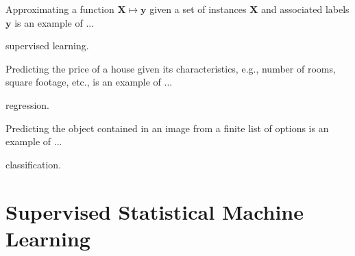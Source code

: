 \begin{questions}
\begin{parts}
\end{parts}

\question Approximating a function $\bm{X} \mapsto \bm{y}$ given a set of instances $\bm{X}$ and associated labels $\bm{y}$ is an example of ...



\begin{solution}[.5in]
supervised learning.
\end{solution}


\question Predicting the price of a house given its characteristics, e.g., number of rooms, square footage, etc., is an example of ...

\begin{solution}[.5in]
regression.
\end{solution}


\question Predicting the object contained in an image from a finite list of options is an example of ...

\begin{solution}[.5in]
classification.
\end{solution}

\end{questions}

\section{Supervised Statistical Machine Learning}

